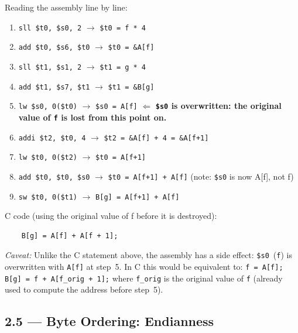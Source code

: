 Reading the assembly line by line:
\begin{enumerate}
  \item \texttt{sll \$t0, \$s0, 2} $\rightarrow$ \texttt{\$t0 = f * 4}
  \item \texttt{add \$t0, \$s6, \$t0} $\rightarrow$ \texttt{\$t0 = \&A[f]}
  \item \texttt{sll \$t1, \$s1, 2} $\rightarrow$ \texttt{\$t1 = g * 4}
  \item \texttt{add \$t1, \$s7, \$t1} $\rightarrow$ \texttt{\$t1 = \&B[g]}
  \item \texttt{lw \$s0, 0(\$t0)} $\rightarrow$ \texttt{\$s0 = A[f]}
        \quad$\Leftarrow$ \textbf{\texttt{\$s0} is overwritten:
        the original value of \texttt{f} is lost from this point on.}
  \item \texttt{addi \$t2, \$t0, 4} $\rightarrow$ \texttt{\$t2 = \&A[f] + 4
        = \&A[f+1]}
  \item \texttt{lw \$t0, 0(\$t2)} $\rightarrow$ \texttt{\$t0 = A[f+1]}
  \item \texttt{add \$t0, \$t0, \$s0} $\rightarrow$ \texttt{\$t0 = A[f+1]
        + A[f]} \quad (note: \texttt{\$s0} is now A[f], not f)
  \item \texttt{sw \$t0, 0(\$t1)} $\rightarrow$ \texttt{B[g] = A[f+1] + A[f]}
\end{enumerate}

C code (using the original value of f before it is destroyed):
\begin{verbatim}
    B[g] = A[f] + A[f + 1];
\end{verbatim}

{\scriptsize\textit{Caveat:}
Unlike the C statement above, the assembly has a side effect:
\texttt{\$s0}~(\texttt{f}) is overwritten with \texttt{A[f]} at step~5.
In C this would be equivalent to:
\texttt{f = A[f]; B[g] = f + A[f\_orig + 1];}
where \texttt{f\_orig} is the original value of \texttt{f} (already used
to compute the address before step~5).}

\subsection*{2.5 --- Byte Ordering: Endianness}
\hypertarget{sol-2.5}{}

